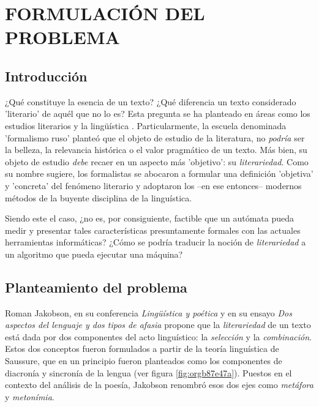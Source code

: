 \documentclass[12pt,letterpaper,twoside]{article}
\begin{document}
\section{FORMULACIÓN DEL PROBLEMA}
\label{sec:orgb40da1e}
\subsection{Introducción}
\label{sec:org5928da4}

¿Qué constituye la esencia de un texto? ¿Qué diferencia un texto
considerado 'literario' de aquél que no lo es? Esta pregunta se ha
planteado en áreas como los estudios literarios y la lingüística
\cite{eijembaum2010teoria}. Particularmente, la escuela denominada
'formalismo ruso' planteó que el objeto de estudio de la literatura,
no \emph{podría} ser la belleza, la relevancia histórica o el valor
pragmático de un texto. Más bien, su objeto de estudio \emph{debe} recaer
en un aspecto más 'objetivo': su \emph{literariedad}.  Como su nombre
sugiere, los formalistas se abocaron a formular una definición
'objetiva' y 'concreta' del fenómeno literario y adoptaron los --en
ese entonces-- modernos métodos de la buyente disciplina de la
linguística.

Siendo este el caso, ¿no es, por consiguiente, factible que un
autómata pueda medir y presentar tales características presuntamente
formales con las actuales herramientas informáticas? ¿Cómo se podría
traducir la noción de \emph{literariedad} a un algoritmo que pueda ejecutar
una máquina?


\subsection{Planteamiento del problema}
\label{sec:org09e36fe}

Roman Jakobson, en su conferencia \emph{Lingüística y poética}
\cite{jakobson1981linguistica} y en su ensayo \emph{Dos aspectos del
lenguaje y dos tipos de afasia} \cite{jakobson1956two} propone que
la \emph{literariedad} de un texto está dada por dos componentes del
acto linguístico: la \emph{selección} y la \emph{combinación}. Estos dos
conceptos fueron formulados a partir de la teoría linguística de
Saussure, que en un principio fueron planteados como los
componentes de diacronía y sincronía de la lengua (ver figura
\ref{fig:orgb87e47a}). Puestos en el contexto del análisis de la poesía,
Jakobson renombró esos dos ejes como \emph{metáfora} y \emph{metonímia}.
\end{document}
